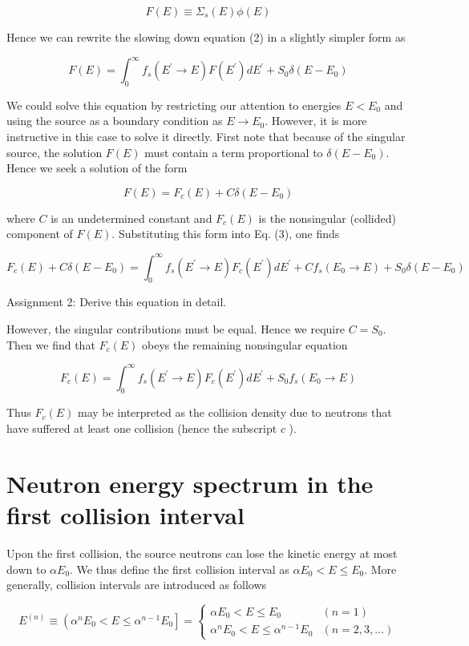 \documentclass[10pt]{article}
\begin{document}
$$
F(E) \equiv \Sigma_{s}(E) \phi(E)
$$

Hence we can rewrite the slowing down equation (2) in a slightly simpler form as

$$
F(E)=\int_{0}^{\infty} f_{s}\left(E^{\prime} \rightarrow E\right) F\left(E^{\prime}\right) d E^{\prime}+S_{0} \delta\left(E-E_{0}\right)
$$

We could solve this equation by restricting our attention to energies $E<E_{0}$ and using the source as a boundary condition as $E \rightarrow E_{0}$. However, it is more instructive in this case to solve it directly. First note that because of the singular source, the solution $F(E)$ must contain a term proportional to $\delta\left(E-E_{0}\right)$. Hence we seek a solution of the form

$$
F(E)=F_{c}(E)+C \delta\left(E-E_{0}\right)
$$

where $C$ is an undetermined constant and $F_{c}(E)$ is the nonsingular (collided) component of $F(E)$. Substituting this form into Eq. (3), one finds

$$
F_{c}(E)+C \delta\left(E-E_{0}\right)=\int_{0}^{\infty} f_{s}\left(E^{\prime} \rightarrow E\right) F_{c}\left(E^{\prime}\right) d E^{\prime}+C f_{s}\left(E_{0} \rightarrow E\right)+S_{0} \delta\left(E-E_{0}\right)
$$

Assignment 2: Derive this equation in detail.

However, the singular contributions must be equal. Hence we require $C=S_{0}$. Then we find that $F_{c}(E)$ obeys the remaining nonsingular equation

$$
F_{c}(E)=\int_{0}^{\infty} f_{s}\left(E^{\prime} \rightarrow E\right) F_{c}\left(E^{\prime}\right) d E^{\prime}+S_{0} f_{s}\left(E_{0} \rightarrow E\right)
$$

Thus $F_{c}(E)$ may be interpreted as the collision density due to neutrons that have suffered at least one collision (hence the subscript $c$ ).

\section{Neutron energy spectrum in the first collision interval}
Upon the first collision, the source neutrons can lose the kinetic energy at most down to $\alpha E_{0}$. We thus define the first collision interval as $\alpha E_{0}<E \leq E_{0}$. More generally, collision intervals are introduced as follows

$$
E^{(n)} \equiv\left(\alpha^{n} E_{0}<E \leq \alpha^{n-1} E_{0}\right]= \begin{cases}\alpha E_{0}<E \leq E_{0} & (n=1) \\ \alpha^{n} E_{0}<E \leq \alpha^{n-1} E_{0} & (n=2,3, \ldots)\end{cases}
$$
\end{document}
